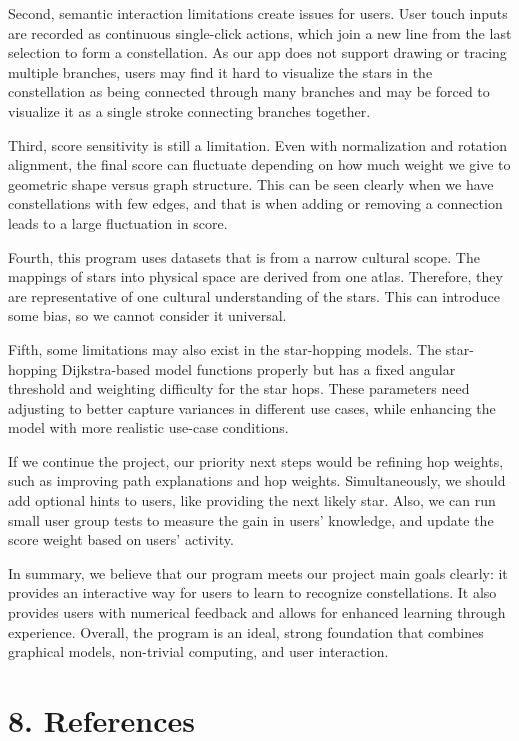 \documentclass[11pt]{article}
\begin{document}
Second, semantic interaction limitations create issues for users. User touch inputs are recorded as continuous single-click actions, which join a new line from the last selection to form a constellation. As our app does not support drawing or tracing multiple branches, users may find it hard to visualize the stars in the constellation as being connected through many branches and may be forced to visualize it as a single stroke connecting branches together.

Third, score sensitivity is still a limitation. Even with normalization and rotation alignment, the final score can fluctuate depending on how much weight we give to geometric shape versus graph structure. This can be seen clearly when we have constellations with few edges, and that is when adding or removing a connection leads to a large fluctuation in score.

Fourth, this program uses datasets that is from a narrow cultural scope. The mappings of stars into physical space are derived from one atlas. Therefore, they are representative of one cultural understanding of the stars. This can introduce some bias, so we cannot consider it universal.

Fifth, some limitations may also exist in the star-hopping models. The star-hopping Dijkstra-based model functions properly but has a fixed angular threshold and weighting difficulty for the star hops. These parameters need adjusting to better capture variances in different use cases, while enhancing the model with more realistic use-case conditions.

If we continue the project, our priority next steps would be refining hop weights, such as improving path explanations and hop weights. Simultaneously, we should add optional hints to users, like providing the next likely star. Also, we can run small user group tests to measure the gain in users’ knowledge, and update the score weight based on users’ activity.

In summary, we believe that our program meets our project main goals clearly: it provides an interactive way for users to learn to recognize constellations. It also provides users with numerical feedback and allows for enhanced learning through experience. Overall, the program is an ideal, strong foundation that combines graphical models, non-trivial computing, and user interaction.

\section*{8. References}
\end{document}
